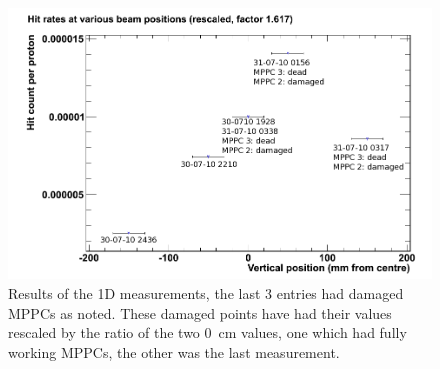  \begin{figure}[hptb]
    \centering
        \includegraphics[width=.9\textwidth]{images/charged_flux/hit_rate_rescaled.png}
    \caption{Results of the 1D measurements, the last 3 entries had damaged MPPCs as noted. These damaged points have had their values rescaled by the ratio of the two 0~cm values, one which had fully working MPPCs, the other was the last measurement.}
    \label{fig:images_hit_rate_rescaled}
 \end{figure}
 
